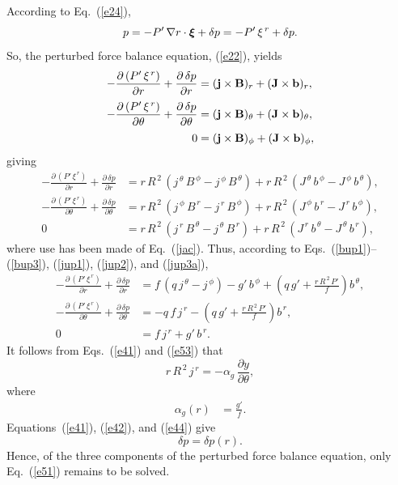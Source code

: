 \documentclass[12pt,prb,aps]{revtex4-1}
\newcommand {\bxi}{\mbox{\boldmath$\xi$}}
\begin{document}
According to Eq.~(\ref{e24}), 
\begin{equation}
p =-P'\,\nabla r\cdot\bxi+\delta p=- P'\,\xi^{\,r}+ \delta p.
\end{equation}
So, the perturbed force balance equation, (\ref{e22}), yields\,\cite{tj}
\begin{align}
-\frac{\partial\, (P'\,\xi^{\,r})}{\partial r}  +\frac{\partial\,\delta p}{\partial r}&= ({\bf j}\times {\bf B})_r+({\bf J}\times {\bf b})_r,\\[0.5ex]
-\frac{\partial\,(P'\,\xi^{\,r})}{\partial \theta} +\frac{\partial\,\delta p}{\partial \theta}&= ({\bf j}\times {\bf B})_\theta+({\bf J}\times {\bf b})_\theta,\\[0.5ex]
0&= ({\bf j}\times {\bf B})_\phi+({\bf J}\times {\bf b})_\phi,
\end{align}
giving\,\cite{tj}
\begin{align}
-\frac{\partial\, (P'\,\xi^{\,r})}{\partial r}+\frac{\partial\,\delta p}{\partial r} &=r\,R^{\,2}\,(j^{\,\theta}\,B^{\,\phi}-j^{\,\phi}\,B^{\,\theta}) + r\,R^{\,2}\,(J^{\,\theta}\,b^{\,\phi}-J^{\,\phi}\,b^{\,\theta}),\\[0.5ex]
-\frac{\partial\,(P'\,\xi^{\,r})}{\partial \theta} +\frac{\partial\,\delta p}{\partial \theta}&=r\,R^{\,2}\,(j^{\,\phi}\,B^{\,r}-j^{\,r}\,B^{\,\phi}) + r\,R^{\,2}\,(J^{\,\phi}\,b^{\,r}-J^{\,r}\,b^{\,\phi}),\\[0.5ex]
0&=r\,R^{\,2}\,(j^{\,r}\,B^{\,\theta}-j^{\,\theta}\,B^{\,r}) + r\,R^{\,2}\,(J^{\,r}\,b^{\,\theta}-J^{\,\theta}\,b^{\,r}),
\end{align}
where use has been made of Eq.~(\ref{jac}). 
Thus, according to Eqs.~(\ref{bup1})--(\ref{bup3}), (\ref{jup1}), (\ref{jup2}), and (\ref{jup3a}), 
\begin{align}
-\frac{\partial\, (P'\,\xi^{\,r})}{\partial r}  +\frac{\partial\,\delta p}{\partial r}&= f\,(q\,j^{\,\theta} -j^{\,\phi}) - g'\,b^{\,\phi} + \left(q\,g'+\frac{r\,R^{\,2}\,P'}{f}\right)b^{\,\theta},\label{e51}\\[0.5ex]
-\frac{\partial\,(P'\,\xi^{\,r})}{\partial \theta} +\frac{\partial\,\delta p}{\partial \theta}&=-q\,f\,j^{\,r} - \left(q\,g'+\frac{r\,R^{\,2}\,P'}{f}\right)b^{\,r},\label{e44}\\[0.5ex]
0&= f\,j^{\,r}+g'\,b^{\,r}.\label{e53}
\end{align}
It follows from Eqs.~(\ref{e41}) and (\ref{e53}) that 
\begin{equation}\label{e54}
r\,R^{\,2}\,j^{\,r} = -\alpha_g\,\frac{\partial y}{\partial\theta},
\end{equation}
where
\begin{align}
\alpha_g (r)&= \frac{g'}{f}.\label{ag}
\end{align}
Equations~(\ref{e41}), (\ref{e42}), and (\ref{e44}) give 
\begin{equation}\label{e54a}
\delta p = \delta p(r).
\end{equation}
Hence, of the three components of the perturbed force balance equation, only Eq.~(\ref{e51}) remains to be solved. 
\end{document}
